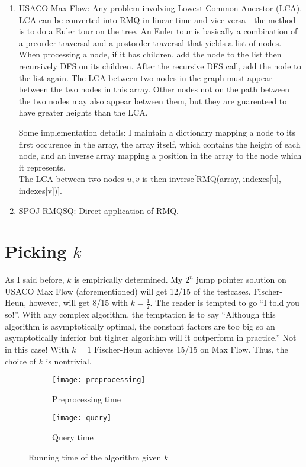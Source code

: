 \documentclass[11pt, oneside]{article}
\begin{document}
\begin{enumerate}
  \item \href{http://www.usaco.org/index.php?page=viewproblem2&cpid=576}{USACO Max Flow}:
  Any problem involving Lowest Common Ancestor (LCA).
  LCA can be converted into RMQ in linear time and vice versa - the method is to
  do a Euler tour on the tree. An Euler tour is basically a combination of a
  preorder traversal and a postorder traversal that yields a list of nodes.
  When processing a node, if it has children, add the node to the list then recursively
  DFS on its children. After the recursive DFS call, add the node to the list again.
  The LCA between two nodes in the graph must appear between the two nodes in this array.
  Other nodes not on the path between the two nodes may also appear between them,
  but they are guarenteed to have greater heights than the LCA.

  Some implementation details: I maintain a dictionary mapping a node to its first
  occurence in the array, the array itself, which contains the height of each node,
  and an inverse array mapping a position in the array to the node which it represents. \\
  The LCA between two nodes \( u, v \) is then inverse[RMQ(array, indexes[u], indexes[v])].

  \item \href{https://www.spoj.com/problems/RMQSQ/}{SPOJ RMQSQ}: Direct application of RMQ.

\end{enumerate}

\newpage

\section{Picking \( k \)}

As I said before, \( k \) is empirically determined. My \( 2^n \) jump pointer solution
on USACO Max Flow (aforementioned) will get 12/15 of the testcases. Fischer-Heun, however,
will get 8/15 with \( k = \frac{1}{2} \). The reader is tempted to go ``I told you so!''.
With any complex algorithm, the temptation is to say ``Although this algorithm is asymptotically optimal,
the constant factors are too big so an asymptotically inferior but tighter algorithm
will it outperform in practice.'' Not in this case! With \( k = 1 \) Fischer-Heun achieves
15/15 on Max Flow. Thus, the choice of \( k \) is nontrivial.

\begin{figure}[h!]
    \centering
    \begin{subfigure}[b]{0.4 \textwidth}
        \texttt{[image: preprocessing]}
        \caption{Preprocessing time}
    \end{subfigure}
    \hfill
    \begin{subfigure}[b]{0.4 \textwidth}
        \texttt{[image: query]}
        \caption{Query time}
    \end{subfigure}
    \caption{Running time of the algorithm given \( k \)}
\end{figure}
\end{document}
